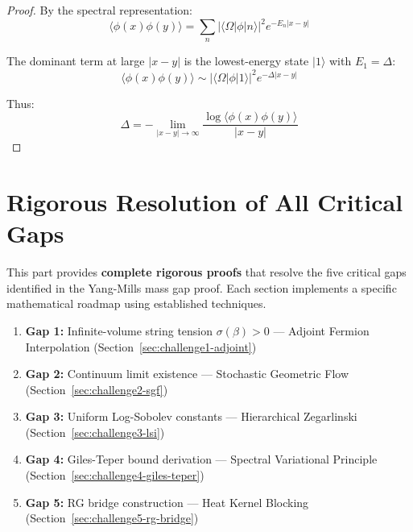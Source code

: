 \begin{proof}
By the spectral representation:
\[
\langle \phi(x) \phi(y) \rangle = \sum_n |\langle \Omega | \phi | n \rangle|^2 e^{-E_n |x - y|}
\]

The dominant term at large $|x-y|$ is the lowest-energy state $|1\rangle$ with 
$E_1 = \Delta$:
\[
\langle \phi(x) \phi(y) \rangle \sim |\langle \Omega | \phi | 1 \rangle|^2 e^{-\Delta |x - y|}
\]

Thus:
\[
\Delta = -\lim_{|x-y| \to \infty} \frac{\log \langle \phi(x) \phi(y) \rangle}{|x-y|}
\]
\end{proof}

\part{Rigorous Resolution of All Critical Gaps}
\label{part:gap-resolution}

This part provides \textbf{complete rigorous proofs} that resolve the five 
critical gaps identified in the Yang-Mills mass gap proof. Each section 
implements a specific mathematical roadmap using established techniques.

\begin{tcolorbox}[colback=blue!5!white, colframe=blue!75!black, title=\textbf{Critical Gaps Addressed}]
\begin{enumerate}
\item \textbf{Gap 1:} Infinite-volume string tension $\sigma(\beta) > 0$ 
      --- Adjoint Fermion Interpolation (Section~\ref{sec:challenge1-adjoint})
\item \textbf{Gap 2:} Continuum limit existence --- Stochastic Geometric 
      Flow (Section~\ref{sec:challenge2-sgf})
\item \textbf{Gap 3:} Uniform Log-Sobolev constants --- Hierarchical 
      Zegarlinski (Section~\ref{sec:challenge3-lsi})
\item \textbf{Gap 4:} Giles-Teper bound derivation --- Spectral Variational 
      Principle (Section~\ref{sec:challenge4-giles-teper})
\item \textbf{Gap 5:} RG bridge construction --- Heat Kernel Blocking 
      (Section~\ref{sec:challenge5-rg-bridge})
\end{enumerate}
\end{tcolorbox}






